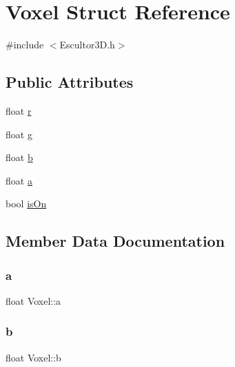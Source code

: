 \hypertarget{struct_voxel}{}\section{Voxel Struct Reference}
\label{struct_voxel}


{\ttfamily \#include $<$Escultor3\+D.\+h$>$}

\subsection*{Public Attributes}
\begin{DoxyCompactItemize}
\item 
float \mbox{\hyperlink{struct_voxel_a06872ec79b836120b551a848968c0f1b}{r}}
\item 
float \mbox{\hyperlink{struct_voxel_a27c0da1ed2ff430401d23ff171612a73}{g}}
\item 
float \mbox{\hyperlink{struct_voxel_a5cd8432b1d7d0fd8b79e0fc7d10373a8}{b}}
\item 
float \mbox{\hyperlink{struct_voxel_a3ce2579eb0a9f09a07112ce7498a638e}{a}}
\item 
bool \mbox{\hyperlink{struct_voxel_a6fbe8bd53f64685ac4210726d40fc775}{is\+On}}
\end{DoxyCompactItemize}


\subsection{Member Data Documentation}
\mbox{\label{struct_voxel_a3ce2579eb0a9f09a07112ce7498a638e}} 
\subsubsection{\texorpdfstring{a}{a}}
{\footnotesize\ttfamily float Voxel\+::a}

\mbox{\label{struct_voxel_a5cd8432b1d7d0fd8b79e0fc7d10373a8}} 
\subsubsection{\texorpdfstring{b}{b}}
{\footnotesize\ttfamily float Voxel\+::b}

\mbox{\label{struct_voxel_a27c0da1ed2ff430401d23ff171612a73}} 
